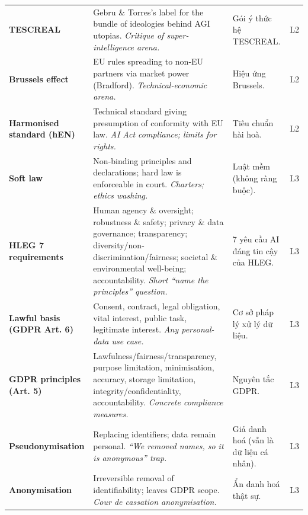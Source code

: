 \documentclass[11pt,a4paper]{article}
\begin{document}
{\begin{longtable}{>{\RaggedRight\arraybackslash\bfseries}p{3.3cm}>{\RaggedRight\arraybackslash}p{5.1cm}>{\RaggedRight\arraybackslash}p{5.1cm}>{\centering\arraybackslash}p{0.8cm}}
TESCREAL & Gebru \& Torres’s label for the bundle of ideologies behind AGI utopias. \newline\textit{\color{teal}Critique of super-intelligence arena.} & \textcolor{tipc}{Gói ý thức hệ TESCREAL.} & L2\\[3pt]
Brussels effect & EU rules spreading to non-EU partners via market power (Bradford). \newline\textit{\color{teal}Technical-economic arena.} & \textcolor{tipc}{Hiệu ứng Brussels.} & L2\\[3pt]
Harmonised standard (hEN) & Technical standard giving presumption of conformity with EU law. \newline\textit{\color{teal}AI Act compliance; limits for rights.} & \textcolor{tipc}{Tiêu chuẩn hài hoà.} & L2\\[3pt]
Soft law & Non-binding principles and declarations; hard law is enforceable in court. \newline\textit{\color{teal}Charters; ethics washing.} & \textcolor{tipc}{Luật mềm (không ràng buộc).} & L3\\[3pt]
HLEG 7 requirements & Human agency \& oversight; robustness \& safety; privacy \& data governance; transparency; diversity/non-discrimination/fairness; societal \& environmental well-being; accountability. \newline\textit{\color{teal}Short “name the principles” question.} & \textcolor{tipc}{7 yêu cầu AI đáng tin cậy của HLEG.} & L3\\[3pt]
Lawful basis (GDPR Art. 6) & Consent, contract, legal obligation, vital interest, public task, legitimate interest. \newline\textit{\color{teal}Any personal-data use case.} & \textcolor{tipc}{Cơ sở pháp lý xử lý dữ liệu.} & L3\\[3pt]
GDPR principles (Art. 5) & Lawfulness/fairness/transparency, purpose limitation, minimisation, accuracy, storage limitation, integrity/confidentiality, accountability. \newline\textit{\color{teal}Concrete compliance measures.} & \textcolor{tipc}{Nguyên tắc GDPR.} & L3\\[3pt]
Pseudonymisation & Replacing identifiers; data remain personal. \newline\textit{\color{teal}“We removed names, so it is anonymous” trap.} & \textcolor{tipc}{Giả danh hoá (vẫn là dữ liệu cá nhân).} & L3\\[3pt]
Anonymisation & Irreversible removal of identifiability; leaves GDPR scope. \newline\textit{\color{teal}Cour de cassation anonymisation.} & \textcolor{tipc}{Ẩn danh hoá thật sự.} & L3\\[3pt]

\end{longtable}}
\end{document}
